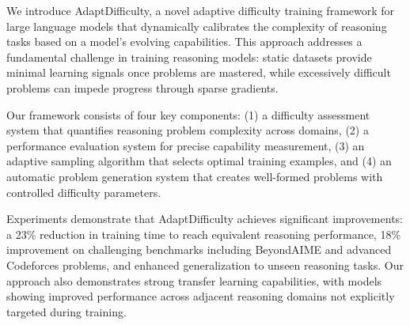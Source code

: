 
We introduce AdaptDifficulty, a novel adaptive difficulty training framework for large language models that dynamically calibrates the complexity of reasoning tasks based on a model's evolving capabilities. This approach addresses a fundamental challenge in training reasoning models: static datasets provide minimal learning signals once problems are mastered, while excessively difficult problems can impede progress through sparse gradients.

Our framework consists of four key components: (1) a difficulty assessment system that quantifies reasoning problem complexity across domains, (2) a performance evaluation system for precise capability measurement, (3) an adaptive sampling algorithm that selects optimal training examples, and (4) an automatic problem generation system that creates well-formed problems with controlled difficulty parameters.

Experiments demonstrate that AdaptDifficulty achieves significant improvements: a 23\% reduction in training time to reach equivalent reasoning performance, 18\% improvement on challenging benchmarks including BeyondAIME and advanced Codeforces problems, and enhanced generalization to unseen reasoning tasks. Our approach also demonstrates strong transfer learning capabilities, with models showing improved performance across adjacent reasoning domains not explicitly targeted during training.

\date{April 26, 2025}